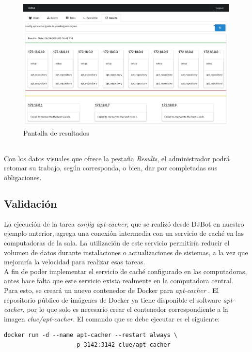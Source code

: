 \documentclass[a4paper,12pt]{article}
\begin{document}
\begin{figure}[htb]
\centering
\includegraphics[width=.9\linewidth]{./img/resultados.jpg}
\caption{Pantalla de resultados}
\end{figure}\\

\newpage
Con los datos visuales que ofrece la pestaña \emph{Results}, el administrador podrá retomar su trabajo, según corresponda, o bien, dar por completadas sus obligaciones.\\


\subsection{Validación}
\label{sec:orgheadline28}

La ejecución de la tarea \emph{config apt-cacher}, que se realizó desde DJBot en nuestro ejemplo anterior, agrega una conexión intermedia con un servicio de caché en las computadoras de la sala. La utilización de este servicio permitiría reducir el volumen de datos durante instalaciones o actualizaciones de sistemas, a la vez que mejoraría la velocidad para realizar esas tareas.\\

A fin de poder implementar el servicio de caché configurado en las computadoras, antes hace falta que este servicio exista realmente en la computadora central. Para esto, se creará un nuevo contenedor de Docker para \emph{apt-cacher} \cite{apt-cacher}. El repositorio público de imágenes de Docker ya tiene disponible el software \emph{apt-cacher}, por lo que solo es necesario crear el contenedor correspondiente a la imagen \emph{clue/apt-cacher}. El comando que se debe ejecutar es el siguiente:\\
\newpage
\begin{verbatim}
docker run -d --name apt-cacher --restart always \
                    -p 3142:3142 clue/apt-cacher
\end{verbatim}
\end{document}
